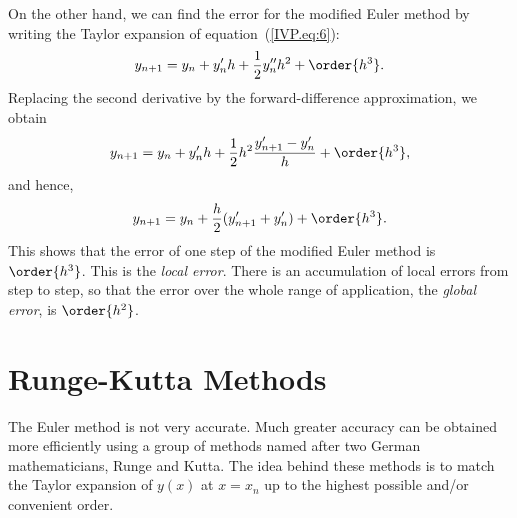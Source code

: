 On the other hand, we can find the error for the modified Euler method by
writing the Taylor expansion of equation~(\ref{IVP.eq:6}):
%
\begin{equation}
  y_{n+1} = y_n + y'_n h+ \frac{1}{2} y''_n h^2 + \order{h^3}.
  \label{IVP.eq:11}
\end{equation} 
%
Replacing the second derivative by the forward-difference
approximation, we obtain 
%
\begin{equation}
  y_{n+1} = y_n + y'_n h + \frac{1}{2} h^2 \frac{y'_{n+1}-y'_n}{h} + \order{h^3},
  \label{IVP.eq:12}
\end{equation}
%
and hence,
%
\begin{equation}
  y_{n+1} = y_n + \frac{h}{2}(y'_{n+1}+y'_n) + \order{h^3}.
  \label{IVP.eq:13}
\end{equation}
%
This shows that the error of one step of the modified Euler method is
$\order{h^3}$. This is the \textit{local error}. There is an accumulation
of local errors from step to step, so that the error over the whole
range of application, the \textit{global error}, is $\order{h^2}$.

\section{Runge-Kutta Methods}

The Euler method is not very accurate. Much greater accuracy can be
obtained more efficiently using a group of methods named after two
German mathematicians, Runge and Kutta.  The idea behind these methods
is to match the Taylor expansion of $y(x)$ at $x=x_n$ up to the
highest possible and/or convenient order.

